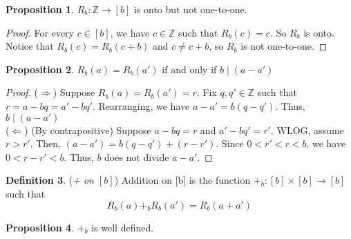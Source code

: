 \documentclass[14pt]{article}
\theoremstyle{definition}
\newtheorem{definition}{Definition}[subsection]
\newtheorem{proposition}[definition]{Proposition}
\begin{document}
\vspace{2mm} %

\begin{proposition}
    $R_b\colon \mathbb{Z}\rightarrow [b]$ is onto but not one-to-one.
\end{proposition}
\begin{proof}
    For every $c\in [b]$, we have $c\in \mathbb{Z}$ such that $R_b(c)=c$. So $R_b$ is onto. Notice that $R_b(c)=R_b(c+b)$ and $c\not=c+b$, so $R_b $ is not one-to-one.
\end{proof}
\vspace{2mm} %

\begin{proposition}
    $R_b(a)=R_b(a')$ if and only if $b\mid (a-a')$
\end{proposition}
\begin{proof}
    ($\Rightarrow$) Suppose  $R_b(a)=R_b(a')=r$. Fix $q,q'\in \mathbb{Z}$ such that $r=a-bq=a'-bq'$. Rearranging, we have $a-a'=b(q-q')$. Thus, $b\mid (a-a')$\\
    ($\Leftarrow$) (By contrapositive) Suppose $a-bq=r $ and $a'-bq'=r'$. WLOG, assume $r>r'$. Then, $(a-a')=b(q-q')+(r-r')$. Since $0<r'<r<b$, we have $0<r-r'<b$. Thus, $b$ does not divide $a-a'$. 
\end{proof}

\vspace{2mm} %

\begin{definition}
    (\textit{+ on $[b]$}) Addition on [b] is the function $+_b\colon [b]\times [b]\rightarrow[b]$ such that 
    \begin{equation*}
        R_b(a)+_bR_b(a')=R_b(a+a')
    \end{equation*}
\end{definition}

\vspace{2mm} %

\begin{proposition}
    $+_b$ is well defined.
\end{proposition}
\end{document}
